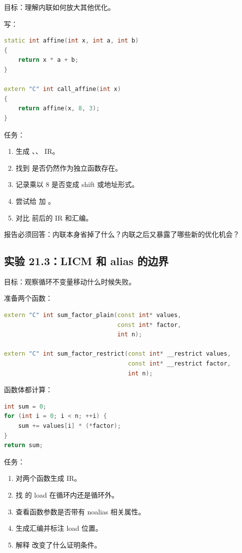 \begin{labbox}
目标：理解内联如何放大其他优化。

写：

\begin{lstlisting}[language=C++]
static int affine(int x, int a, int b)
{
    return x * a + b;
}

extern "C" int call_affine(int x)
{
    return affine(x, 8, 3);
}
\end{lstlisting}

任务：

\begin{enumerate}
  \item 生成 、、 IR。
  \item 找到  是否仍然作为独立函数存在。
  \item 记录乘以 8 是否变成 shift 或地址形式。
  \item 尝试给  加 。
  \item 对比  前后的 IR 和汇编。
\end{enumerate}

报告必须回答：内联本身省掉了什么？内联之后又暴露了哪些新的优化机会？
\end{labbox}

\subsection{实验 21.3：LICM 和 alias 的边界}

\begin{labbox}
目标：观察循环不变量移动什么时候失败。

准备两个函数：

\begin{lstlisting}[language=C++]
extern "C" int sum_factor_plain(const int* values,
                                const int* factor,
                                int n);

extern "C" int sum_factor_restrict(const int* __restrict values,
                                   const int* __restrict factor,
                                   int n);
\end{lstlisting}

函数体都计算：

\begin{lstlisting}[language=C++]
int sum = 0;
for (int i = 0; i < n; ++i) {
    sum += values[i] * (*factor);
}
return sum;
\end{lstlisting}

任务：

\begin{enumerate}
  \item 对两个函数生成  IR。
  \item 找  的 load 在循环内还是循环外。
  \item 查看函数参数是否带有 noalias 相关属性。
  \item 生成汇编并标注 load 位置。
  \item 解释  改变了什么证明条件。
\end{enumerate}
\end{labbox}

